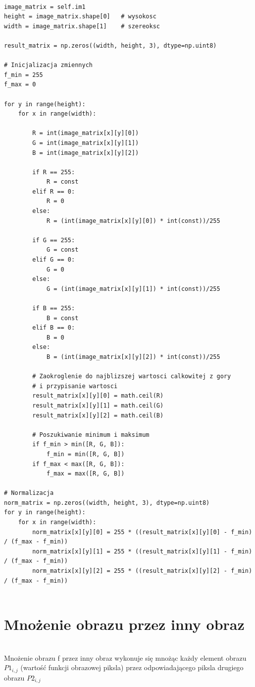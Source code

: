 \documentclass[final,a4paper,openany,12pt]{mwbk}
\begin{document}
\begin{lstlisting}[caption=Mnożenie obrazu barwowego przez zadaną liczbę]

image_matrix = self.im1
height = image_matrix.shape[0]   # wysokosc
width = image_matrix.shape[1]    # szereoksc

result_matrix = np.zeros((width, height, 3), dtype=np.uint8)

# Inicjalizacja zmiennych
f_min = 255
f_max = 0

for y in range(height):
    for x in range(width):  

        R = int(image_matrix[x][y][0])
        G = int(image_matrix[x][y][1])
        B = int(image_matrix[x][y][2])

        if R == 255:
            R = const
        elif R == 0:
            R = 0
        else:
            R = (int(image_matrix[x][y][0]) * int(const))/255 
        
        if G == 255:
            G = const
        elif G == 0:
            G = 0
        else:
            G = (int(image_matrix[x][y][1]) * int(const))/255 
        
        if B == 255:
            B = const
        elif B == 0:
            B = 0
        else:
            B = (int(image_matrix[x][y][2]) * int(const))/255 

        # Zaokroglenie do najblizszej wartosci calkowitej z gory
        # i przypisanie wartosci
        result_matrix[x][y][0] = math.ceil(R)
        result_matrix[x][y][1] = math.ceil(G)
        result_matrix[x][y][2] = math.ceil(B)

        # Poszukiwanie minimum i maksimum                
        if f_min > min([R, G, B]):
            f_min = min([R, G, B])
        if f_max < max([R, G, B]):
            f_max = max([R, G, B])

# Normalizacja
norm_matrix = np.zeros((width, height, 3), dtype=np.uint8)
for y in range(height):
    for x in range(width):
        norm_matrix[x][y][0] = 255 * ((result_matrix[x][y][0] - f_min) / (f_max - f_min))
        norm_matrix[x][y][1] = 255 * ((result_matrix[x][y][1] - f_min) / (f_max - f_min))
        norm_matrix[x][y][2] = 255 * ((result_matrix[x][y][2] - f_min) / (f_max - f_min))


\end{lstlisting}

\section {Mnożenie obrazu przez inny obraz}
\hfill\\
\indent
Mnożenie obrazu f przez inny obraz wykonuje się mnożąc każdy element obrazu $P1_{i,j}$ (wartość funkcji obrazowej piksla) przez odpowiadającego piksla drugiego obrazu $P2_{i,j}$
\end{document}
